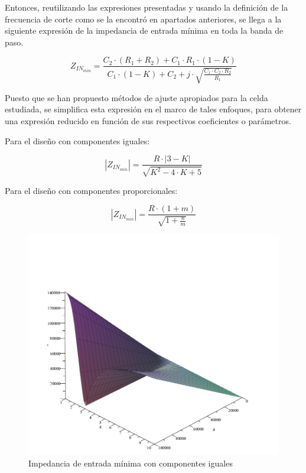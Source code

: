 Entonces, reutilizando las expresiones presentadas y usando la definici\'on de la frecuencia de corte como se la encontr\'o en apartados anteriores, se llega a la siguiente expresi\'on de la impedancia de entrada
m\'inima en toda la banda de paso.

\begin{equation}
    Z_{IN_{min}} = \frac{C_2 \cdot (R_1 + R_2) + C_1 \cdot R_1 \cdot (1 - K)}{C_1 \cdot (1 - K) + C_2 + j \cdot \sqrt{\frac{C_1 \cdot C_2 \cdot R_2}{R_1}}}
\end{equation}

Puesto que se han propuesto m\'etodos de ajuste apropiados para la celda estudiada, se simplifica esta expresi\'on en el marco de tales enfoques, para obtener una expresi\'on
reducido en funci\'on de sus respectivos coeficientes o par\'ametros.

Para el dise\~no con componentes iguales:

\begin{equation}
    |Z_{IN_{min}}| = \frac{R \cdot |3 - K|}{\sqrt{K^{2} - 4 \cdot K + 5}}
    \label{eq:impedancia_minima_componentes_iguales}
\end{equation}

Para el dise\~no con componentes proporcionales:

\begin{equation}
    |Z_{IN_{min}}| = \frac{R \cdot (1 + m)}{\sqrt{1 + \frac{n}{m}}}
    \label{eq:impedancia_minima_componentes_proporcionales}
\end{equation}

\begin{figure}[H]
    \centering
    \includegraphics[scale=0.45]{../EJ1/Recursos/impedancia_entrada_componentes_iguales.png}
    \caption{Impedancia de entrada m\'inima con componentes iguales}
\end{figure}

